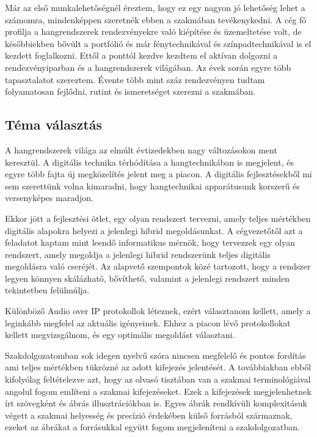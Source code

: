 Már az első munkalehetőségnél éreztem, hogy ez egy nagyon jó lehetőség lehet a számomra, mindenképpen szeretnék ebben a szakmában tevékenykedni.
A cég fő profilja a hangrendszerek rendezvényekre való kiépítése és üzemeltetése volt, de későbbiekben bővült a portfólió és már fénytechnikával és színpadtechnikával is el kezdett foglalkozni. 
Ettől a ponttól kezdve kezdtem el aktívan dolgozni a rendezvényiparban és a hangrendszerek világában. Az évek során egyre több tapasztalatot
szereztem. Évente több mint száz rendezvényen tudtam folyamatosan fejlődni, rutint és ismeretséget szerezni a szakmában.

\subsection{Téma választás}

A hangrendszerek világa az elmúlt évtizedekben nagy változásokon ment keresztül. A digitális technika térhódítása a hangtechnikában is megjelent, és egyre több fajta új megközelítés jelent meg a piacon.
A digitális fejlesztésekből mi sem szerettünk volna kimaradni, hogy hangtechnikai apparátusunk korszerű és versenyképes maradjon.

Ekkor jött a fejlesztési ötlet, egy olyan rendszert tervezni, amely teljes mértékben digitális alapokra helyezi a jelenlegi hibrid megoldásunkat. A cégvezetőtől azt a feladatot kaptam mint leendő informatikus mérnök,
hogy tervezzek egy olyan rendszert, amely megoldja a jelenlegi hibrid rendszerünk teljes digitális megoldásra való cseréjét. 
Az alapvető szempontok közé tartozott, hogy a rendszer legyen könnyen skálázható, bővíthető, valamint a jelenlegi rendszert minden tekintetben felülmúlja.

Különböző Audio over IP protokollok léteznek, ezért választanom kellett, amely a leginkább megfelel az aktuális igényeinek.
Ehhez a piacon lévő protokollokat kellett megvizsgálnom, és egy optimális megoldást választani. 

Szakdolgozatomban sok idegen nyelvű szóra nincsen megfelelő és pontos fordítás ami teljes mértékben tükrözné az adott kifejezés jelentését.
A továbbiakban ebből kifolyólag feltételezve azt, hogy az olvasó tisztában van a szakmai terminológiával angolul fogom említeni a szakmai kifejezéseket.
Ezek a kifejezések megjelenhetnek írt szövegként és ábrás illusztrációkban is. Egyes ábrák rendkívüli komplexitásuk végett a szakmai helyesség és precízió érdekében
külső forrásból származnak, ezeket az ábrákat a forrásukkal együtt fogom megjeleníteni a szakdolgozatban.
